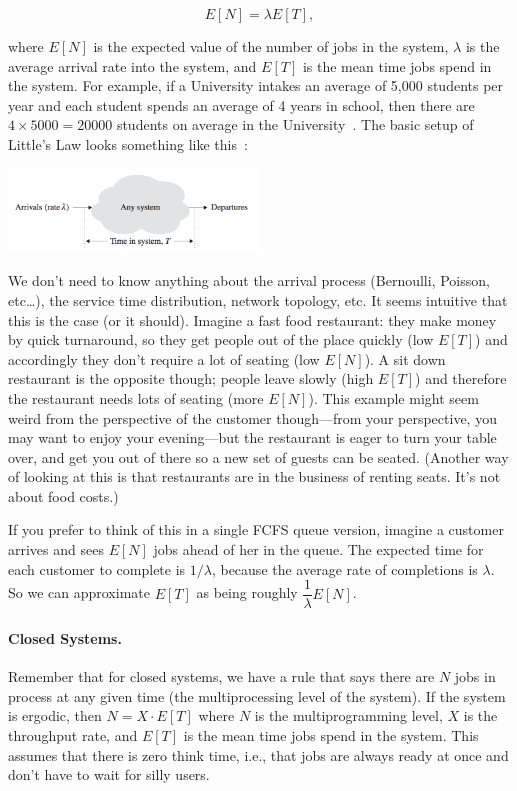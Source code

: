 \documentclass[a4paper]{report}
\begin{document}
\[
	E[N] = \lambda E[T],
\]

where $E[N]$ is the expected value of the number of jobs in the system, $\lambda$ is the average arrival rate into the system, and $E[T]$ is the mean time jobs spend in the system. For example, if a University intakes an average of 5,000 students per year and each student spends an average of 4 years in school, then there are $4 \times 5000=20000$ students on average in the University~\cite{sigman-little-law}. The basic setup of Little's Law looks something like this~\cite{pmd}:

\begin{center}
	\includegraphics[width=0.5\textwidth]{images/littleslaw.png}
\end{center}

We don't need to know anything about the arrival process (Bernoulli, Poisson, etc\ldots), the service time distribution, network topology, etc. It seems intuitive that this is the case (or it should). Imagine a fast food restaurant: they make money by quick turnaround, so they get people out of the place quickly (low $E[T]$) and accordingly they don't require a lot of seating (low $E[N]$). A sit down restaurant is the opposite though; people leave slowly (high $E[T]$) and therefore the restaurant needs lots of seating (more $E[N]$). This example might seem weird from the perspective of the customer though---from your perspective, you may want to enjoy your evening---but the restaurant is eager to turn your table over, and get you out of there so a new set of guests can be seated. (Another way of looking at this is that restaurants are in the business of renting seats. It's not about food costs.)

If you prefer to think of this in a single FCFS queue version, imagine a customer arrives and sees $E[N]$ jobs ahead of her in the queue. The expected time for each customer to complete is $1/\lambda$, because the average rate of completions is $\lambda $. So we can approximate $E[T]$ as being roughly $\dfrac{1}{\lambda}E[N]$.

\paragraph{Closed Systems.} Remember that for closed systems, we have a rule that says there are $N$ jobs in process at any given time (the multiprocessing level of the system). If the system is ergodic, then $N = X \cdot E[T]$ where $N$ is the multiprogramming level, $X$ is the throughput rate, and $E[T]$ is the mean time jobs spend in the system. This assumes that there is zero think time, i.e., that jobs are always ready at once and don't have to wait for silly users.
\end{document}
